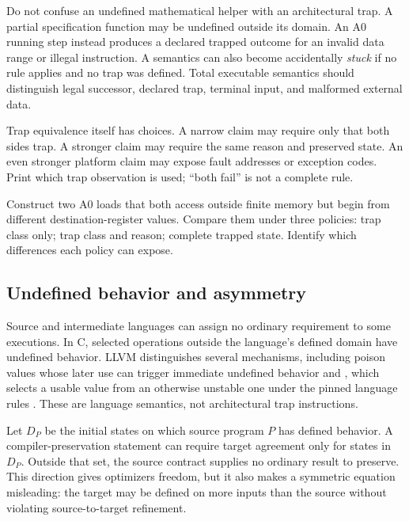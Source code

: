 Do not confuse an undefined mathematical helper with an architectural trap.
A partial specification function may be undefined outside its domain. An A0
running step instead produces a declared trapped outcome for an invalid data
range or illegal instruction. A semantics can also become accidentally
\emph{stuck} if no rule applies and no trap was defined. Total executable
semantics should distinguish legal successor, declared trap, terminal input,
and malformed external data.

Trap equivalence itself has choices. A narrow claim may require only that both
sides trap. A stronger claim may require the same reason and preserved state.
An even stronger platform claim may expose fault addresses or exception codes.
Print which trap observation is used; ``both fail'' is not a complete rule.

\begin{tryit}[title={Choose a trap observation}]
Construct two A0 loads that both access outside finite memory but begin from
different destination-register values. Compare them under three policies:
trap class only; trap class and reason; complete trapped state. Identify which
differences each policy can expose.
\end{tryit}

\subsection{Undefined behavior and asymmetry}

Source and intermediate languages can assign no ordinary requirement to some
executions. In C, selected operations outside the language's defined domain
have undefined behavior. LLVM distinguishes several mechanisms, including
poison values whose later use can trigger immediate undefined behavior and
, which selects a usable value from an otherwise unstable one
under the pinned language rules \autocite{llvm2026langref}. These are language
semantics, not architectural trap instructions.

Let \(D_P\) be the initial states on which source program \(P\) has defined
behavior. A compiler-preservation statement can require target agreement only
for states in \(D_P\). Outside that set, the source contract supplies no
ordinary result to preserve. This direction gives optimizers freedom, but it
also makes a symmetric equation misleading: the target may be defined on more
inputs than the source without violating source-to-target refinement.

